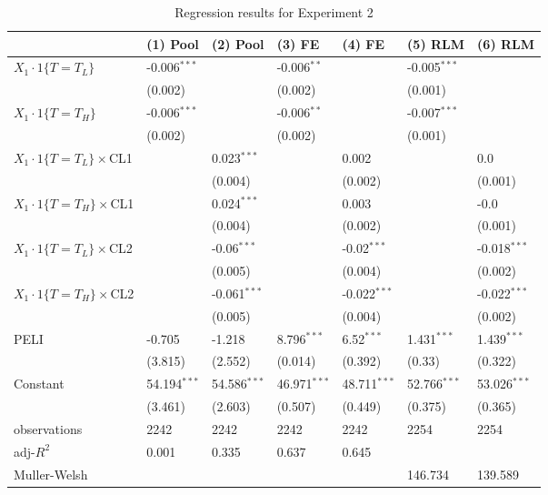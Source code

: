 \documentclass[12pt]{article}
\begin{document}
\begin{table}
    \caption{Regression results for Experiment 2}
    \vspace*{12pt}
    \centering

      \begin{tabular}{lllllll}
\hline
& (1) Pool & (2) Pool & (3) FE & (4) FE & (5) RLM & (6) RLM \\
\hline
$X_1\cdot1\{T=T_L\}$ & -0.006$^{***}$ &  & -0.006$^{**}$ &  & -0.005$^{***}$ &  \\
 & (0.002) &  & (0.002) &  & (0.001) &  \\
$X_1\cdot1\{T=T_H\}$ & -0.006$^{***}$ &  & -0.006$^{**}$ &  & -0.007$^{***}$ &  \\
 & (0.002) &  & (0.002) &  & (0.001) &  \\
$X_1\cdot1\{T=T_L\}\times$CL1 &  & 0.023$^{***}$ &  & 0.002 &  & 0.0 \\
 &  & (0.004) &  & (0.002) &  & (0.001) \\
$X_1\cdot1\{T=T_H\}\times$CL1 &  & 0.024$^{***}$ &  & 0.003 &  & -0.0 \\
 &  & (0.004) &  & (0.002) &  & (0.001) \\
$X_1\cdot1\{T=T_L\}\times$CL2 &  & -0.06$^{***}$ &  & -0.02$^{***}$ &  & -0.018$^{***}$ \\
 &  & (0.005) &  & (0.004) &  & (0.002) \\
$X_1\cdot1\{T=T_H\}\times$CL2 &  & -0.061$^{***}$ &  & -0.022$^{***}$ &  & -0.022$^{***}$ \\
 &  & (0.005) &  & (0.004) &  & (0.002) \\
PELI & -0.705 & -1.218 & 8.796$^{***}$ & 6.52$^{***}$ & 1.431$^{***}$ & 1.439$^{***}$ \\
 & (3.815) & (2.552) & (0.014) & (0.392) & (0.33) & (0.322) \\
Constant & 54.194$^{***}$ & 54.586$^{***}$ & 46.971$^{***}$ & 48.711$^{***}$ & 52.766$^{***}$ & 53.026$^{***}$ \\
 & (3.461) & (2.603) & (0.507) & (0.449) & (0.375) & (0.365) \\\hline

observations & 2242 & 2242 & 2242 & 2242 & 2254 & 2254 \\
adj-$R^2$ & 0.001 & 0.335 & 0.637 & 0.645 &  &  \\
Muller-Welsh &  &  &  &  & 146.734 & 139.589 \\
\hline
\end{tabular}


\end{table}
\end{document}
